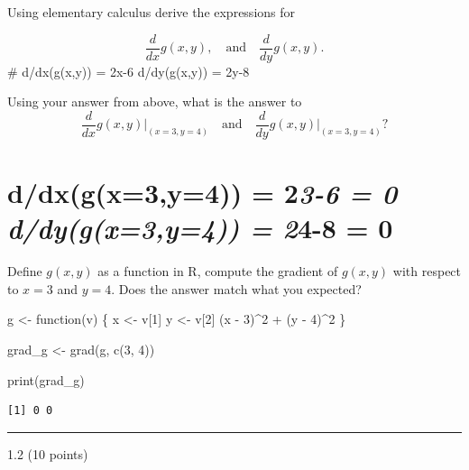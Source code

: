 \documentclass[
  letterpaper,
  DIV=11,
  numbers=noendperiod]{scrartcl}
\newenvironment{Shaded}{\begin{snugshade}}{\end{snugshade}}
\newcommand{\ControlFlowTok}[1]{\textcolor[rgb]{0.00,0.23,0.31}{#1}}
\newcommand{\DecValTok}[1]{\textcolor[rgb]{0.68,0.00,0.00}{#1}}
\newcommand{\FunctionTok}[1]{\textcolor[rgb]{0.28,0.35,0.67}{#1}}
\newcommand{\NormalTok}[1]{\textcolor[rgb]{0.00,0.23,0.31}{#1}}
\newcommand{\OtherTok}[1]{\textcolor[rgb]{0.00,0.23,0.31}{#1}}
\newcommand{\SpecialCharTok}[1]{\textcolor[rgb]{0.37,0.37,0.37}{#1}}
\begin{document}
Using elementary calculus derive the expressions for

\[
\frac{d}{dx}g(x, y), \quad \text{and} \quad \frac{d}{dy}g(x, y).
\] \# d/dx(g(x,y)) = 2x-6 d/dy(g(x,y)) = 2y-8

Using your answer from above, what is the answer to \[
\frac{d}{dx}g(x, y) \Bigg|_{(x=3, y=4)} \quad \text{and} \quad \frac{d}{dy}g(x, y) \Bigg|_{(x=3, y=4)} ?
\]

\hypertarget{ddxgx3y4-23-6-0-ddygx3y4-24-8-0}{%
\section{\texorpdfstring{d/dx(g(x=3,y=4)) = 2\emph{3-6 = 0
d/dy(g(x=3,y=4)) = 2}4-8 =
0}{d/dx(g(x=3,y=4)) = 23-6 = 0 d/dy(g(x=3,y=4)) = 24-8 = 0}}\label{ddxgx3y4-23-6-0-ddygx3y4-24-8-0}}

Define \(g(x, y)\) as a function in R, compute the gradient of
\(g(x, y)\) with respect to \(x=3\) and \(y=4\). Does the answer match
what you expected?

\begin{Shaded}
\begin{Highlighting}[]
\NormalTok{g }\OtherTok{\textless{}{-}} \ControlFlowTok{function}\NormalTok{(v) \{}
\NormalTok{  x }\OtherTok{\textless{}{-}}\NormalTok{ v[}\DecValTok{1}\NormalTok{]}
\NormalTok{  y }\OtherTok{\textless{}{-}}\NormalTok{ v[}\DecValTok{2}\NormalTok{]}
\NormalTok{  (x }\SpecialCharTok{{-}} \DecValTok{3}\NormalTok{)}\SpecialCharTok{\^{}}\DecValTok{2} \SpecialCharTok{+}\NormalTok{ (y }\SpecialCharTok{{-}} \DecValTok{4}\NormalTok{)}\SpecialCharTok{\^{}}\DecValTok{2}
\NormalTok{\}}


\NormalTok{grad\_g }\OtherTok{\textless{}{-}} \FunctionTok{grad}\NormalTok{(g, }\FunctionTok{c}\NormalTok{(}\DecValTok{3}\NormalTok{, }\DecValTok{4}\NormalTok{))}

\FunctionTok{print}\NormalTok{(grad\_g)}
\end{Highlighting}
\end{Shaded}

\begin{verbatim}
[1] 0 0
\end{verbatim}

\begin{center}\rule{0.5\linewidth}{0.5pt}\end{center}

1.2 (10 points)

\[
\newcommand{\u}{\boldsymbol{u}}\newcommand{\v}{\boldsymbol{v}}
\]
\end{document}

